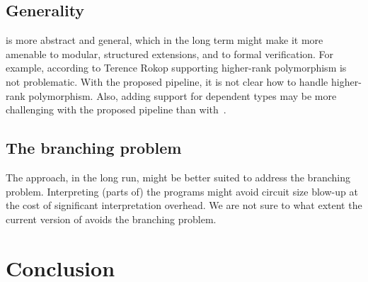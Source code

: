 \documentclass[
    9pt,            %
    techreport,        %
    affiltop,       %
]{art}
\begin{document}
\subsection{Generality}

\Geb{} is more abstract and general, which in the long term might make it
more amenable to modular, structured extensions, and to formal
verification. For example, according to Terence Rokop supporting higher-rank
polymorphism is not problematic. With the proposed pipeline, it is not
clear how to handle higher-rank polymorphism. Also, adding support for
dependent types may be more challenging with the proposed pipeline
than with~\Geb{}.

\subsection{The branching problem}

The \Geb{} approach, in the long run, might be better suited to address the branching problem. Interpreting (parts of) the programs might avoid circuit size blow-up at the cost of significant interpretation overhead. We are not sure to what extent the current version of \Geb{} avoids the branching problem.

\section{Conclusion}\label{sec_conclusion}
\end{document}

